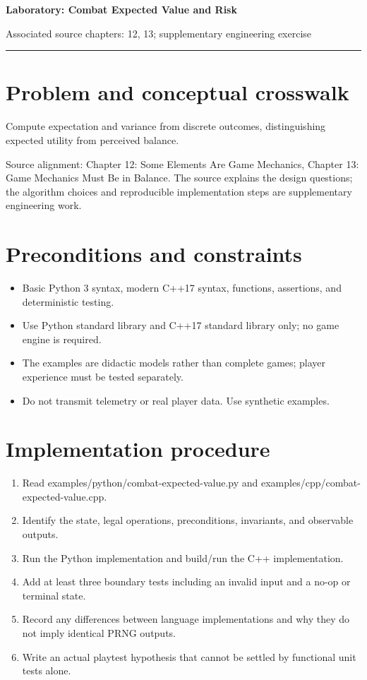 \documentclass[11pt]{article}
\begin{document}
{\huge\bfseries\color{suiteblue} Laboratory: Combat Expected Value and Risk}\par
\vspace{0.15in}
{\normalsize\color{suitegray} Associated source chapters: 12, 13; supplementary engineering exercise}\par
\vspace{0.15in}\hrule\vspace{0.15in}

\section{Problem and conceptual crosswalk}
Compute expectation and variance from discrete outcomes, distinguishing expected utility from perceived balance.

Source alignment: Chapter 12: Some Elements Are Game Mechanics, Chapter 13: Game Mechanics Must Be in Balance. The source explains the design questions; the algorithm choices and reproducible implementation steps are supplementary engineering work.


\section{Preconditions and constraints}
\begin{itemize}
\item Basic Python 3 syntax, modern C++17 syntax, functions, assertions, and deterministic testing.
\item Use Python standard library and C++17 standard library only; no game engine is required.
\item The examples are didactic models rather than complete games; player experience must be tested separately.
\item Do not transmit telemetry or real player data. Use synthetic examples.
\end{itemize}

\section{Implementation procedure}
\begin{enumerate}
\item Read examples/python/combat-expected-value.py and examples/cpp/combat-expected-value.cpp.
\item Identify the state, legal operations, preconditions, invariants, and observable outputs.
\item Run the Python implementation and build/run the C++ implementation.
\item Add at least three boundary tests including an invalid input and a no-op or terminal state.
\item Record any differences between language implementations and why they do not imply identical PRNG outputs.
\item Write an actual playtest hypothesis that cannot be settled by functional unit tests alone.
\end{enumerate}
\end{document}
